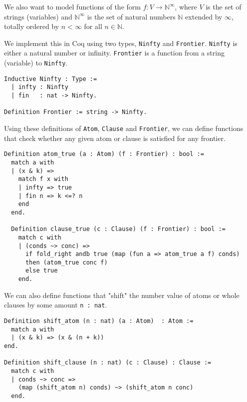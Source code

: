 We also want to model functions of the form $f : V \rightarrow \mathbb{N}^{\infty}$, where $V$ is the set of strings (variables)
and $\mathbb{N}^{\infty}$ is the set of natural numbers $\mathbb{N}$
extended by $\infty$, totally ordered by $n < \infty$ for all $n \in \mathbb{N}$.

We implement this in Coq using two types, \lstinline{Ninfty} and \lstinline{Frontier}.
\lstinline{Ninfty} is either a natural number or infinity.
\lstinline{Frontier} is a function from a string (variable) to \lstinline{Ninfty}.

\begin{lstlisting}[language=Coq, label={lst:ninfty_frontier_def}, caption={Def. of \lstinline{Ninfty} and \lstinline{Frontier} in Coq}]
Inductive Ninfty : Type :=
  | infty : Ninfty
  | fin   : nat -> Ninfty.

Definition Frontier := string -> Ninfty.
\end{lstlisting}

Using these definitions of \lstinline{Atom}, \lstinline{Clause} and \lstinline{Frontier},
we can define functions that check whether any given atom or clause is satisfied for any frontier.

\begin{lstlisting}[language=Coq, label={lst:atom_clause_true_def}, caption={Def. of \lstinline{atom_true} and \lstinline{clause_true} in Coq}]
Definition atom_true (a : Atom) (f : Frontier) : bool :=
  match a with
  | (x & k) =>
    match f x with
    | infty => true
    | fin n => k <=? n
    end
  end.

  Definition clause_true (c : Clause) (f : Frontier) : bool :=
    match c with
    | (conds ~> conc) =>
      if fold_right andb true (map (fun a => atom_true a f) conds)
      then (atom_true conc f)
      else true
    end.
\end{lstlisting}

We can also define functions that "shift" the number value of atoms or whole clauses by some amount \lstinline{n : nat}.

\begin{lstlisting}[language=Coq, label={lst:shift_atom_clause_true}, caption={Def. of \lstinline{shift_atom} and \lstinline{shift_clause} in Coq}]
Definition shift_atom (n : nat) (a : Atom)  : Atom :=
  match a with
  | (x & k) => (x & (n + k))
end.

Definition shift_clause (n : nat) (c : Clause) : Clause :=
  match c with
  | conds ~> conc =>
    (map (shift_atom n) conds) ~> (shift_atom n conc)
  end.
\end{lstlisting}
